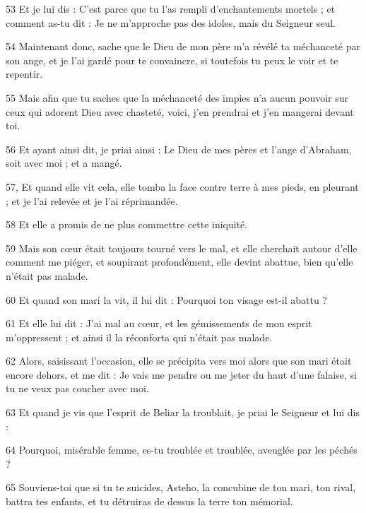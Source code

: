 \par 53 Et je lui dis : C'est parce que tu l'as rempli d'enchantements mortels ; et comment as-tu dit : Je ne m'approche pas des idoles, mais du Seigneur seul.

\par 54 Maintenant donc, sache que le Dieu de mon père m'a révélé ta méchanceté par son ange, et je l'ai gardé pour te convaincre, si toutefois tu peux le voir et te repentir.

\par 55 Mais afin que tu saches que la méchanceté des impies n'a aucun pouvoir sur ceux qui adorent Dieu avec chasteté, voici, j'en prendrai et j'en mangerai devant toi.

\par 56 Et ayant ainsi dit, je priai ainsi : Le Dieu de mes pères et l'ange d'Abraham, soit avec moi ; et a mangé.

\par 57, Et quand elle vit cela, elle tomba la face contre terre à mes pieds, en pleurant ; et je l'ai relevée et je l'ai réprimandée.

\par 58 Et elle a promis de ne plus commettre cette iniquité.

\par 59 Mais son cœur était toujours tourné vers le mal, et elle cherchait autour d'elle comment me piéger, et soupirant profondément, elle devint abattue, bien qu'elle n'était pas malade.

\par 60 Et quand son mari la vit, il lui dit : Pourquoi ton visage est-il abattu ?

\par 61 Et elle lui dit : J'ai mal au cœur, et les gémissements de mon esprit m'oppressent ; et ainsi il la réconforta qui n'était pas malade.

\par 62 Alors, saisissant l'occasion, elle se précipita vers moi alors que son mari était encore dehors, et me dit : Je vais me pendre ou me jeter du haut d'une falaise, si tu ne veux pas coucher avec moi.

\par 63 Et quand je vis que l'esprit de Beliar la troublait, je priai le Seigneur et lui dis :

\par 64 Pourquoi, misérable femme, es-tu troublée et troublée, aveuglée par les péchés ?

\par 65 Souviens-toi que si tu te suicides, Asteho, la concubine de ton mari, ton rival, battra tes enfants, et tu détruiras de dessus la terre ton mémorial.

